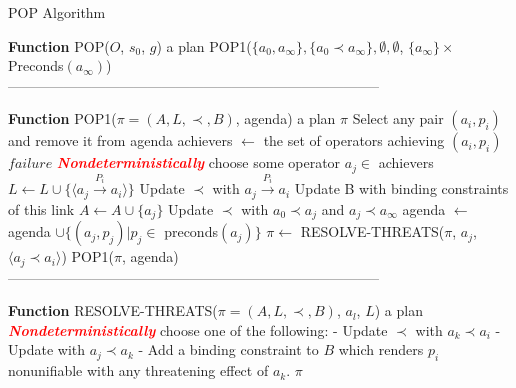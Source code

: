 \begin{algorithm}
      \caption{POP Algorithm}
      \label{alg:pop}
      \begin{algorithmic}[1]
            \STATE \textbf{Function} POP($O$, $s_0$, $g$)
            \ENSURE a plan
            \RETURN POP1($\{a_0, a_{\infty}\}, \{a_0 \prec a_{\infty}\}, \emptyset, \emptyset$, $\{a_{\infty}\} \times$ Preconds$(a_{\infty})$)\\

            \STATE --------------------------------------------------------------------------------
            \STATE

            \STATE \textbf{Function} POP1($\pi = (A, L, \prec, B)$, agenda)
            \ENSURE a plan
            \RETURN $\pi$
            \ENDIF
            \STATE Select any pair $(a_i, p_i)$ and remove it from agenda
            \STATE achievers $\leftarrow$ the set of operators achieving $(a_i, p_i)$
            \RETURN $failure$
            \ENDIF
            \STATE \textcolor{red}{\textbf{\textit{Nondeterministically}}} choose some operator $a_j \in$ achievers
            \STATE $L \leftarrow L \cup \{\langle a_j \xrightarrow{\text{$P_i$}} a_i\rangle\}$
            \STATE Update $\prec$ with $a_j \xrightarrow{\text{$P_i$}} a_i$
            \STATE Update B with binding constraints of this link
            \STATE $A \leftarrow A \cup \{a_j\}$
            \STATE Update $\prec$ with $a_0 \prec a_j$ and $a_j \prec a_{\infty}$
            \STATE agenda $\leftarrow$ agenda $\cup \{(a_j, p_j)|p_j \in$ preconds$(a_j)\}$
            \ENDIF
            \STATE $\pi \leftarrow$ RESOLVE-THREATS($\pi$, $a_j$, $\langle a_j \prec a_i\rangle$)
            \RETURN POP1($\pi$, agenda)\\

            \STATE --------------------------------------------------------------------------------
            \STATE

            \STATE \textbf{Function} RESOLVE-THREATS($\pi = (A, L, \prec, B)$, $a_l$, $L$)
            \ENSURE a plan
            \STATE \textcolor{red}{\textbf{\textit{Nondeterministically}}} choose one of the following:
            \STATE - Update $\prec$ with $a_k \prec a_i$
            \STATE - Update with $a_j \prec a_k$
            \STATE - Add a binding constraint to $B$ which renders $p_i$ nonunifiable with any threatening effect of $a_k$.
            \ENDFOR
            \RETURN $\pi$
      \end{algorithmic}
\end{algorithm}

